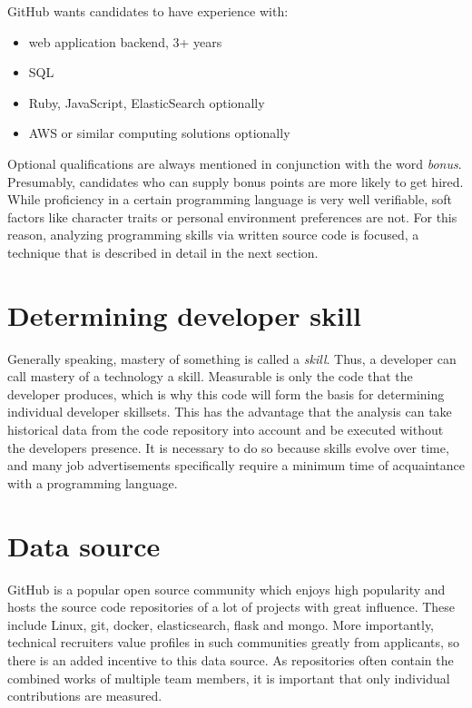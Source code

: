 GitHub wants candidates to have experience with:
\begin{itemize}
    \item web application backend, 3+ years
    \item SQL
    \item Ruby, JavaScript, ElasticSearch optionally
    \item AWS or similar computing solutions optionally
\end{itemize}

Optional qualifications are always mentioned in conjunction with the word \textit{bonus}. Presumably, candidates who can supply bonus points are more likely to get hired. While proficiency in a certain programming language is very well verifiable, soft factors like character traits or personal environment preferences are not. For this reason, analyzing programming skills via written source code is focused, a technique that is described in detail in the next section.

\section{Determining developer skill}
Generally speaking, mastery of something is called a \textit{skill}. Thus, a developer can call mastery of a technology a skill. Measurable is only the code that the developer produces, which is why this code will form the basis for determining individual developer skillsets. This has the advantage that the analysis can take historical data from the code repository into account and be executed without the developers presence. It is necessary to do so because skills evolve over time, and many job advertisements specifically require a minimum time of acquaintance with a programming language.

\section{Data source}\label{sec:data-source}
GitHub is a popular open source community which enjoys high popularity
and hosts the source code repositories of a lot of projects with great influence. These include Linux, git, docker, elasticsearch, flask and mongo\cite{rpfd:2014}. More importantly, technical recruiters value profiles in such communities greatly from applicants\cite{md:2013}, so there is an added incentive to this data source. As repositories often contain the combined works of multiple team members, it is important that only individual contributions are measured.

